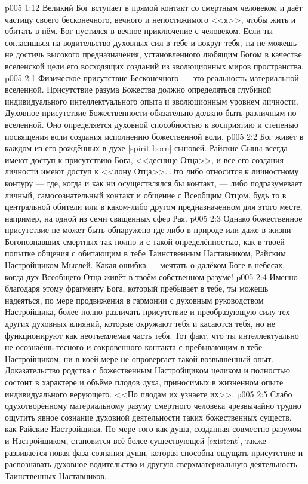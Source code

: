 \vs p005 1:12 Великий Бог вступает в прямой контакт со смертным человеком и даёт частицу своего бесконечного, вечного и непостижимого <<я>>, чтобы жить и обитать в нём. Бог пустился в вечное приключение с человеком. Если ты согласишься на водительство духовных сил в тебе и вокруг тебя, ты не можешь не достичь высокого предназначения, установленного любящим Богом в качестве вселенской цели его восходящих созданий из эволюционных миров пространства.
\vs p005 2:1 Физическое присутствие Бесконечного --- это реальность материальной вселенной. Присутствие разума Божества должно определяться глубиной индивидуального интеллектуального опыта и эволюционным уровнем личности. Духовное присутствие Божественности обязательно должно быть различным по вселенной. Оно определяется духовной способностью к восприятию и степенью посвящения воли создания исполнению божественной воли.
\vs p005 2:2 Бог живёт в каждом из его рождённых в духе [spirit\hyp{}born] сыновей. Райские Сыны всегда имеют доступ к присутствию Бога, <<деснице Отца>>, и все его создания\hyp{}личности имеют доступ к <<лону Отца>>. Это либо относится к личностному контуру --- где, когда и как ни осуществлялся бы контакт, --- либо подразумевает личный, самосознательный контакт и общение с Всеобщим Отцом, будь то в центральной обители или в каком\hyp{}либо другом предназначенном для этого месте, например, на одной из семи священных сфер Рая.
\vs p005 2:3 Однако божественное присутствие не может быть обнаружено где\hyp{}либо в природе или даже в жизни Богопознавших смертных так полно и с такой определённостью, как в твоей попытке общения с обитающим в тебе Таинственным Наставником, Райским Настройщиком Мыслей. Какая ошибка --- мечтать о далёком Боге в небесах, когда дух Всеобщего Отца живёт в твоём собственном разуме!
\vs p005 2:4 \pc Именно благодаря этому фрагменту Бога, который пребывает в тебе, ты можешь надеяться, по мере продвижения в гармонии с духовным руководством Настройщика, более полно различать присутствие и преобразующую силу тех других духовных влияний, которые окружают тебя и касаются тебя, но не функционируют как неотъемлемая часть тебя. Тот факт, что ты интеллектуально не осознаёшь тесного и сокровенного контакта с пребывающим в тебе Настройщиком, ни в коей мере не опровергает такой возвышенный опыт. Доказательство родства с божественным Настройщиком целиком и полностью состоит в характере и объёме плодов духа, приносимых в жизненном опыте индивидуального верующего. <<По плодам их узнаете их>>.
\vs p005 2:5 Слабо одухотворённому материальному разуму смертного человека чрезвычайно трудно ощутить явное сознание духовной деятельности таких божественных существ, как Райские Настройщики. По мере того как душа, созданная совместно разумом и Настройщиком, становится всё более существующей [existent], также развивается новая фаза сознания души, которая способна ощущать присутствие и распознавать духовное водительство и другую сверхматериальную деятельность Таинственных Наставников.
